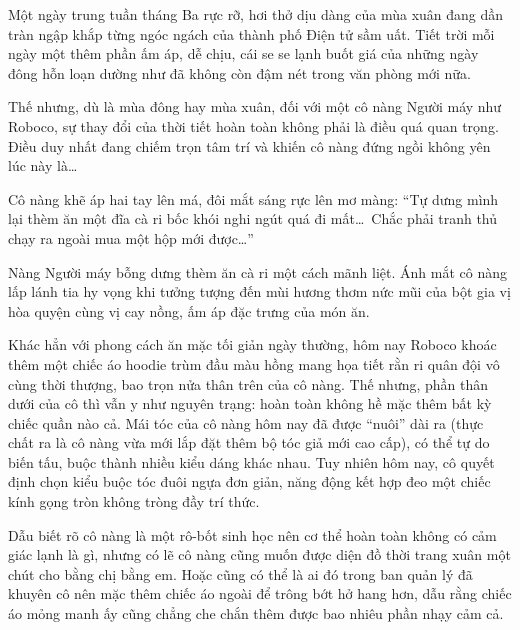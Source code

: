 \documentclass[../main.tex]{subfiles}
\begin{document}

Một ngày trung tuần tháng Ba rực rỡ, hơi thở dịu dàng của mùa xuân đang dần tràn ngập khắp từng ngóc ngách của thành phố Điện tử sầm uất. Tiết trời mỗi ngày một thêm phần ấm áp, dễ chịu, cái se se lạnh buốt giá của những ngày đông hỗn loạn dường như đã không còn đậm nét trong văn phòng mới nữa.

Thế nhưng, dù là mùa đông hay mùa xuân, đối với một cô nàng Người máy như Roboco, sự thay đổi của thời tiết hoàn toàn không phải là điều quá quan trọng. Điều duy nhất đang chiếm trọn tâm trí và khiến cô nàng đứng ngồi không yên lúc này là\dots

Cô nàng khẽ áp hai tay lên má, đôi mắt sáng rực lên mơ màng: ``Tự dưng mình lại thèm ăn một đĩa cà ri bốc khói nghi ngút quá đi mất\dots\ Chắc phải tranh thủ chạy ra ngoài mua một hộp mới được\dots''

Nàng Người máy bỗng dưng thèm ăn cà ri một cách mãnh liệt. Ánh mắt cô nàng lấp lánh tia hy vọng khi tưởng tượng đến mùi hương thơm nức mũi của bột gia vị hòa quyện cùng vị cay nồng, ấm áp đặc trưng của món ăn.

Khác hẳn với phong cách ăn mặc tối giản ngày thường, hôm nay Roboco khoác thêm một chiếc áo hoodie trùm đầu màu hồng mang họa tiết rằn ri quân đội vô cùng thời thượng, bao trọn nửa thân trên của cô nàng. Thế nhưng, phần thân dưới của cô thì vẫn y như nguyên trạng: hoàn toàn không hề mặc thêm bất kỳ chiếc quần nào cả. Mái tóc của cô nàng hôm nay đã được ``nuôi'' dài ra (thực chất ra là cô nàng vừa mới lắp đặt thêm bộ tóc giả mới cao cấp), có thể tự do biến tấu, buộc thành nhiều kiểu dáng khác nhau. Tuy nhiên hôm nay, cô quyết định chọn kiểu buộc tóc đuôi ngựa đơn giản, năng động kết hợp đeo một chiếc kính gọng tròn không tròng đầy trí thức.


Dẫu biết rõ cô nàng là một rô-bốt sinh học nên cơ thể hoàn toàn không có cảm giác lạnh là gì, nhưng có lẽ cô nàng cũng muốn được diện đồ thời trang xuân một chút cho bằng chị bằng em. Hoặc cũng có thể là ai đó trong ban quản lý đã khuyên cô nên mặc thêm chiếc áo ngoài để trông bớt hở hang hơn, dẫu rằng chiếc áo mỏng manh ấy cũng chẳng che chắn thêm được bao nhiêu phần nhạy cảm cả.
\end{document}
